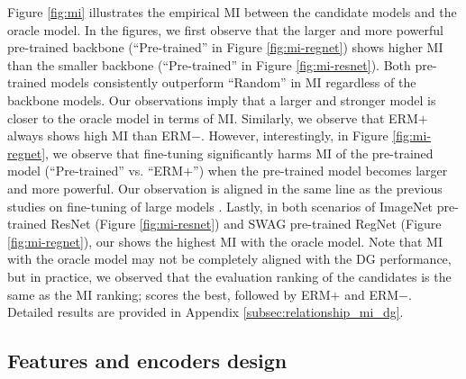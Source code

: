Figure \ref{fig:mi} illustrates the empirical MI between the candidate models and the oracle model.
In the figures, we first observe that the larger and more powerful pre-trained backbone (``Pre-trained'' in Figure \ref{fig:mi-regnet}) shows higher MI than the smaller backbone (``Pre-trained'' in Figure \ref{fig:mi-resnet}). Both pre-trained models consistently outperform ``Random'' in MI regardless of the backbone models. Our observations imply that a larger and stronger model is closer to the oracle model in terms of MI.
Similarly, we observe that ERM$+$ always shows high MI than ERM$-$. However, interestingly, in Figure \ref{fig:mi-regnet}, we observe that fine-tuning significantly harms MI of the pre-trained model (``Pre-trained'' vs. ``ERM$+$'') when the pre-trained model becomes larger and more powerful. Our observation is aligned in the same line as the previous studies on fine-tuning of large models \cite{wortsman2021robust, kumar2022iclr_finetuning_distort}.
Lastly, in both scenarios of ImageNet pre-trained ResNet (Figure \ref{fig:mi-resnet}) and SWAG pre-trained RegNet (Figure \ref{fig:mi-regnet}), our \method{} shows the highest MI with the oracle model.
Note that MI with the oracle model may not be completely aligned with the DG performance, but in practice, we observed that the evaluation ranking of the candidates is the same as the MI ranking; \method{} scores the best, followed by ERM$+$ and ERM$-$. Detailed results are provided in Appendix \ref{subsec:relationship_mi_dg}.


\subsection{Features and encoders design}


